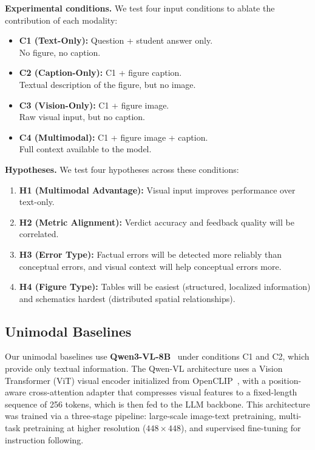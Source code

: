 \documentclass{article} %
\begin{document}
\textbf{Experimental conditions.} We test four input conditions to ablate the contribution of each modality:
\begin{itemize}[itemsep=4pt]
    \item \textbf{C1 (Text-Only):} Question + student answer only.\\
    No figure, no caption.

    \item \textbf{C2 (Caption-Only):} C1 + figure caption.\\
    Textual description of the figure, but no image.

    \item \textbf{C3 (Vision-Only):} C1 + figure image.\\
    Raw visual input, but no caption.

    \item \textbf{C4 (Multimodal):} C1 + figure image + caption.\\
    Full context available to the model.
\end{itemize}

\textbf{Hypotheses.} We test four hypotheses across these conditions:
\begin{enumerate}[itemsep=4pt]
    \item \textbf{H1 (Multimodal Advantage):} Visual input improves performance over text-only.

    \item \textbf{H2 (Metric Alignment):} Verdict accuracy and feedback quality will be correlated.

    \item \textbf{H3 (Error Type):} Factual errors will be detected more reliably than conceptual errors, and visual context will help conceptual errors more.

    \item \textbf{H4 (Figure Type):} Tables will be easiest (structured, localized information) and schematics hardest (distributed spatial relationships).
\end{enumerate}

\subsection{Unimodal Baselines}

Our unimodal baselines use \textbf{Qwen3-VL-8B}~\cite{bai2023qwenvl} under conditions C1 and C2, which provide only textual information. The Qwen-VL architecture uses a Vision Transformer (ViT) visual encoder initialized from OpenCLIP~\cite{bai2023qwenvl}, with a position-aware cross-attention adapter that compresses visual features to a fixed-length sequence of 256 tokens, which is then fed to the LLM backbone. This architecture was trained via a three-stage pipeline: large-scale image-text pretraining, multi-task pretraining at higher resolution ($448{\times}448$), and supervised fine-tuning for instruction following.
\end{document}
